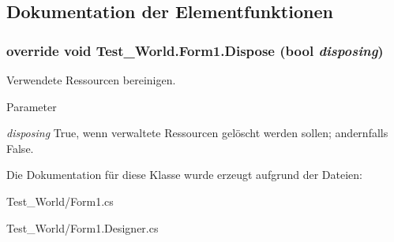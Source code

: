 \subsection{Dokumentation der Elementfunktionen}
\hypertarget{class_test___world_1_1_form1_a76e28105467035fd345da22985304e4b}{
\subsubsection[{Dispose}]{\setlength{\rightskip}{0pt plus 5cm}override void Test\_\-World.Form1.Dispose (bool {\em disposing})}}
\label{class_test___world_1_1_form1_a76e28105467035fd345da22985304e4b}


Verwendete Ressourcen bereinigen. 


\begin{DoxyParams}{Parameter}
\item[{\em disposing}]True, wenn verwaltete Ressourcen gelöscht werden sollen; andernfalls False.\end{DoxyParams}


Die Dokumentation für diese Klasse wurde erzeugt aufgrund der Dateien:\begin{DoxyCompactItemize}
\item 
Test\_\-World/Form1.cs\item 
Test\_\-World/Form1.Designer.cs\end{DoxyCompactItemize}
